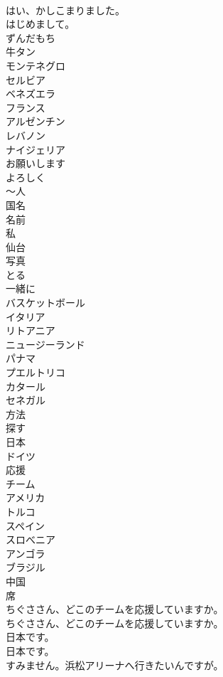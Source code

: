 \documentclass[8pt]{extreport}
\begin{document}
\begin{CJK}{UTF8}{min}
\\	はい、かしこまりました。 
\\	はじめまして。
\\	ずんだもち
\\	牛タン
\\	モンテネグロ
\\	セルビア
\\	ベネズエラ
\\	フランス
\\	アルゼンチン
\\	レバノン
\\	ナイジェリア
\\	お願いします
\\	よろしく
\\	～人
\\	国名
\\	名前
\\	私
\\	仙台
\\	写真
\\	とる
\\	一緒に
\\	バスケットボール
\\	イタリア
\\	リトアニア
\\	ニュージーランド
\\	パナマ
\\	プエルトリコ
\\	カタール
\\	セネガル
\\	方法
\\	探す
\\	日本
\\	ドイツ
\\	応援
\\	チーム
\\	アメリカ
\\	トルコ
\\	スペイン
\\	スロべニア
\\	アンゴラ
\\	ブラジル
\\	中国
\\	席
\\	ちぐささん、どこのチームを応援していますか。	
\\	ちぐささん、どこのチームを応援していますか。 
\\	日本です。	
\\	日本です。 
\\	すみません。浜松アリーナへ行きたいんですが。	

\end{CJK}
\end{document}
